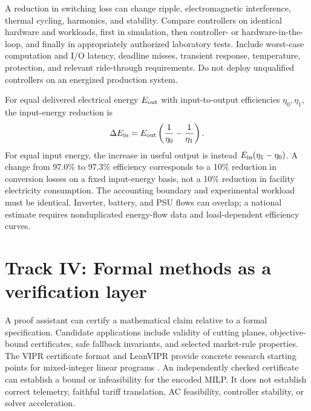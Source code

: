 \documentclass[11pt,letterpaper]{article}
\begin{document}
A reduction in switching loss can change ripple, electromagnetic interference, thermal cycling, harmonics, and stability. Compare controllers on identical hardware and workloads, first in simulation, then controller- or hardware-in-the-loop, and finally in appropriately authorized laboratory tests. Include worst-case computation and I/O latency, deadline misses, transient response, temperature, protection, and relevant ride-through requirements. Do not deploy unqualified controllers on an energized production system.

For equal delivered electrical energy $E_{\rm out}$ with input-to-output efficiencies $\eta_0,\eta_1$, the input-energy reduction is
\begin{equation}
\Delta E_{\rm in}=E_{\rm out}\left(\frac{1}{\eta_0}-\frac{1}{\eta_1}\right).
\end{equation}
For equal input energy, the increase in useful output is instead $E_{\rm in}(\eta_1-\eta_0)$. A change from 97.0\% to 97.3\% efficiency corresponds to a 10\% reduction in conversion losses on a fixed input-energy basis, not a 10\% reduction in facility electricity consumption. The accounting boundary and experimental workload must be identical. Inverter, battery, and PSU flows can overlap; a national estimate requires nonduplicated energy-flow data and load-dependent efficiency curves.

\section{Track IV: Formal methods as a verification layer}
A proof assistant can certify a mathematical claim relative to a formal specification. Candidate applications include validity of cutting planes, objective-bound certificates, safe fallback invariants, and selected market-rule properties. The VIPR certificate format and LeanVIPR provide concrete research starting points for mixed-integer linear programs \cite{vipr,leanvipr}. An independently checked certificate can establish a bound or infeasibility for the encoded MILP. It does not establish correct telemetry, faithful tariff translation, AC feasibility, controller stability, or solver acceleration.
\end{document}
